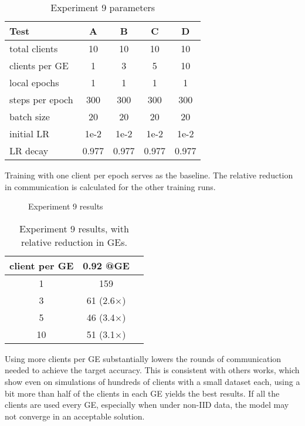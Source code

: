 \begin{table}[H]
    \center
    \begin{tabular}{ | l | c | c | c | c | }
        \hline
        Test & A & B & C & D\\\hline
        total clients   & 10 & 10 & 10 & 10\\\hline
        clients per GE  & 1 & 3 & 5 & 10\\\hline
        local epochs    & 1 & 1 & 1 & 1\\\hline
        steps per epoch & 300 & 300 & 300 & 300\\\hline
        batch size      & 20 & 20 & 20 & 20\\\hline
        initial LR      & 1e-2 & 1e-2 & 1e-2 & 1e-2\\\hline
        LR decay        & 0.977 & 0.977 & 0.977 & 0.977\\\hline
    \end{tabular}
    \caption[Experiment 9 parameters]{Experiment 9 parameters}
\end{table}

Training with one client per epoch serves as the baseline. The relative reduction in communication is calculated for the other training runs.

\begin{figure}[H]
    \center
    
    \caption[Experiment 9 results]{Experiment 9 results}
    \label{fig:Experiment 9 results}
\end{figure}

\begin{table}[H]
\center
    \begin{tabular}{ | c | c | c | }
        \hline
        client per GE & 0.92 @GE\\\hline
        1 & 159\\\hline
        3 & 61 (2.6$\times$)\\\hline
        5 & 46 (3.4$\times$)\\\hline
        10 & 51 (3.1$\times$)\\\hline
    \end{tabular}
    \caption[Experiment 9 results]{Experiment 9 results, with relative reduction in GEs.}
\end{table}
    
Using more clients per GE substantially lowers the rounds of communication needed to achieve the target accuracy. This is consistent with others works, which show even on simulations of hundreds of clients with a small dataset each, using a bit more than half of the clients in each GE yields the best results. If all the clients are used every GE, especially when under non-IID data, the model may not converge in an acceptable solution.
    
